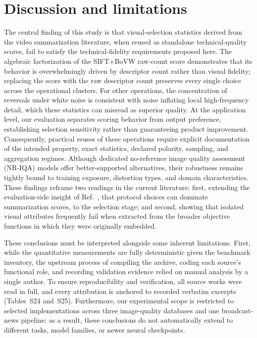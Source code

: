 \section{Discussion and limitations}\label{sec:discussion}


The central finding of this study is that visual-selection statistics derived from the video summarization literature, when reused as standalone technical-quality scores, fail to satisfy the technical-fidelity requirements proposed here. The algebraic factorization of the SIFT+BoVW raw-count score demonstrates that its behavior is overwhelmingly driven by descriptor count rather than visual fidelity; replacing the score with the raw descriptor count preserves every single choice across the \redDe{} operational clusters. For other operations, the concentration of reversals under white noise is consistent with noise inflating local high-frequency detail, which these statistics can misread as superior quality. At the application level, our evaluation separates scoring behavior from output preference, establishing selection sensitivity rather than guaranteeing product improvement. Consequently, practical reuses of these operations require explicit documentation of the intended property, exact statistics, declared polarity, sampling, and aggregation regimes. Although dedicated no-reference image quality assessment (NR-IQA) models offer better-supported alternatives, their robustness remains tightly bound to training exposure, distortion types, and domain characteristics. These findings reframe two readings in the current literature: first, extending the evaluation-side insight of Ref.~\citep{otani2019rethinking}, that protocol choices can dominate summarization scores, to the selection stage; and second, showing that isolated visual attributes frequently fail when extracted from the broader objective functions in which they were originally embedded.

These conclusions must be interpreted alongside some inherent limitations. First, while the quantitative measurements are fully deterministic given the benchmark inventory, the upstream process of compiling the archive, coding each source's functional role, and recording validation evidence relied on manual analysis by a single author. To ensure reproducibility and verification, all \valComPdf{} source works were read in full, and every attribution is anchored to recorded verbatim excerpts (Tables~S24 and~S25). Furthermore, our experimental scope is restricted to selected implementations across three image-quality databases and one broadcast-news pipeline; as a result, these conclusions do not automatically extend to different tasks, model families, or newer neural checkpoints.

